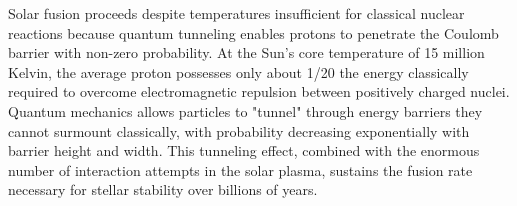 Solar fusion proceeds despite temperatures insufficient for classical nuclear reactions because quantum tunneling enables protons to penetrate the Coulomb barrier with non-zero probability. At the Sun's core temperature of 15 million Kelvin, the average proton possesses only about 1/20 the energy classically required to overcome electromagnetic repulsion between positively charged nuclei. Quantum mechanics allows particles to "tunnel" through energy barriers they cannot surmount classically, with probability decreasing exponentially with barrier height and width. This tunneling effect, combined with the enormous number of interaction attempts in the solar plasma, sustains the fusion rate necessary for stellar stability over billions of years.
